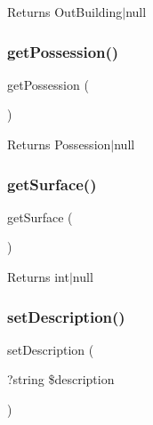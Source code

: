 \begin{DoxyReturn}{Returns}
Out\+Building$\vert$null 
\end{DoxyReturn}
\mbox{\label{class_app_1_1_entity_1_1_own_out_building_a4ad5c74255a75f0d61664cba32657af7}} 
\subsubsection{\texorpdfstring{getPossession()}{getPossession()}}
{\footnotesize\ttfamily get\+Possession (\begin{DoxyParamCaption}{ }\end{DoxyParamCaption})}

\begin{DoxyReturn}{Returns}
Possession$\vert$null 
\end{DoxyReturn}
\mbox{\label{class_app_1_1_entity_1_1_own_out_building_a282b0af88968ac8e268c0f21cdf5f034}} 
\subsubsection{\texorpdfstring{getSurface()}{getSurface()}}
{\footnotesize\ttfamily get\+Surface (\begin{DoxyParamCaption}{ }\end{DoxyParamCaption})}

\begin{DoxyReturn}{Returns}
int$\vert$null 
\end{DoxyReturn}
\mbox{\label{class_app_1_1_entity_1_1_own_out_building_acee77db44e361e2773e2734033f2a1c5}} 
\subsubsection{\texorpdfstring{setDescription()}{setDescription()}}
{\footnotesize\ttfamily set\+Description (\begin{DoxyParamCaption}\item[{?string}]{\$description }\end{DoxyParamCaption})}


